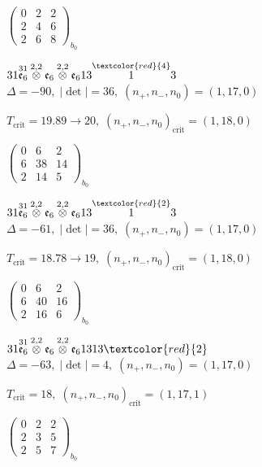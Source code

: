 \documentclass[10pt]{article}
\begin{document}
\hspace{2em}$\left(\begin{smallmatrix}0 & 2 & 2 \\ 2 & 4 & 6 \\ 2 & 6 & 8\end{smallmatrix}\right)_{\!b_0}$

\smallskip

$31\overset{31}{\mathfrak{e}_6}\overset{2,2}{\otimes}\mathfrak{e}_6\overset{2,2}{\otimes}\mathfrak{e}_613\overset{\textcolor{red}{4}}{1}3$ \quad $\Delta=-90,\; |\det|=36,\; (n_+,n_-,n_0)=(1,17,0)$

\hspace{1em}$T_{\text{crit}}=19.89 \to 20,\; (n_+,n_-,n_0)_{\text{crit}}=(1,18,0)$

\hspace{2em}$\left(\begin{smallmatrix}0 & 6 & 2 \\ 6 & 38 & 14 \\ 2 & 14 & 5\end{smallmatrix}\right)_{\!b_0}$

$31\overset{31}{\mathfrak{e}_6}\overset{2,2}{\otimes}\mathfrak{e}_6\overset{2,2}{\otimes}\mathfrak{e}_613\overset{\textcolor{red}{2}}{1}3$ \quad $\Delta=-61,\; |\det|=36,\; (n_+,n_-,n_0)=(1,17,0)$

\hspace{1em}$T_{\text{crit}}=18.78 \to 19,\; (n_+,n_-,n_0)_{\text{crit}}=(1,18,0)$

\hspace{2em}$\left(\begin{smallmatrix}0 & 6 & 2 \\ 6 & 40 & 16 \\ 2 & 16 & 6\end{smallmatrix}\right)_{\!b_0}$

$31\overset{31}{\mathfrak{e}_6}\overset{2,2}{\otimes}\mathfrak{e}_6\overset{2,2}{\otimes}\mathfrak{e}_61313\textcolor{red}{2}$ \quad $\Delta=-63,\; |\det|=4,\; (n_+,n_-,n_0)=(1,17,0)$

\hspace{1em}$T_{\text{crit}}=18,\; (n_+,n_-,n_0)_{\text{crit}}=(1,17,1)$

\hspace{2em}$\left(\begin{smallmatrix}0 & 2 & 2 \\ 2 & 3 & 5 \\ 2 & 5 & 7\end{smallmatrix}\right)_{\!b_0}$
\end{document}
